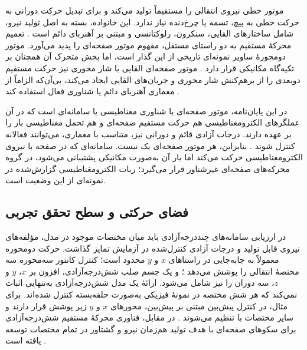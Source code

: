 موتور خطی نیروی انتقالی را مستقیماً تولید می‌کند و برای تبدیل حرکت دورانی به حرکت خطی به پیچ، تسمه یا چرخ‌دنده نیاز ندارد. این خانواده، بسته به اصل تولید نیرو، شامل ساختارهای القایی، سنکرون، رلوکتانسی و مبتنی بر آهنربای دائم است \cite{pierrejeanReviewModelingDesign2024}. تعمیم محرکهٔ مستقیم به دو راستای مستقل، مفهوم موتور صفحه‌ای را پدید می‌آورد. موتور دومحورهٔ ساویر نمونه‌ای تاریخی از این گذار است، اما بخش متحرک آن همچنان بر تکیه‌گاه مکانیکی قرار دارد \cite{edmondr.p.peltaTwoAxisSawyerMotor1987}. موتور صفحه‌ای القایی با شار محوری نیز حرکت مستقیم دوبعدی را از برهم‌کنش شار محوری و جریان‌های القایی ایجاد می‌کند، بی‌آن‌که الزاماً از معماری آهنربای دائم یا شناوری فعال استفاده کند \cite{liElectromagneticAnalysisAxialflux2024}.

در این پایان‌نامه، موتور صفحه‌ای با شناوری مغناطیسی یا  سامانه‌ای است که در آن عملگرهای الکترومغناطیسی هم حرکت مستقیم صفحه‌ای و هم تحمل مغناطیسی بار را بر عهده دارند. درجات آزادی قائم و دورانی نیز، متناسب با معماری، می‌توانند فعالانه کنترل شوند \cite{jansenMagneticallyLevitatedPlanar2007,jansenModelingMagneticallyLevitated2007}. بنابراین، هر موتور صفحه‌ای یک  نیست. سامانه‌ای که در صفحه با نیروی الکترومغناطیسی حرکت می‌کند اما بار آن به‌صورت مکانیکی پشتیبانی می‌شود، در گروه محرکه‌های صفحه‌ای غیرشناور قرار می‌گیرد؛ ربات الکترومغناطیسی گزارش‌شده در \cite{liNonLevitativeElectromagnetRobot2025} نمونه‌ای از این وضعیت است.

\subsection{فضای حرکتی و سطح تحقق تجربی}
\label{subsec:motion_space}

در ارزیابی سامانه‌های چنددرجه‌آزادی باید میان مختصات موجود در مدل، مؤلفه‌های نیروی قابل تولید و درجات آزادی کنترل‌شده در آزمایش تمایز گذاشت. حرکت دومحوره معمولاً به جابه‌جایی در راستاهای $x$ و $y$ محدود است؛ کنترل کانتور سه‌محوره سه مختصهٔ انتقالی را پوشش می‌دهد \cite{j.liHighPrecisionTriaxialContouring2026}؛ و یک جسم صلب شش‌درجه‌آزادی، افزون بر $x$، $y$ و $z$، سه دوران را نیز شامل می‌شود. ارائهٔ یک مدل شش‌درجه‌آزادی به‌تنهایی اثبات نمی‌کند که هر شش مختصه در نمونهٔ فیزیکی به‌صورت حلقه‌بسته کنترل شده‌اند. برای مثال، در کنترل پیش‌بین مبتنی بر پیش‌بین، محورهای $x$ و $y$ زیر پوشش  قرار دارند و سایر مختصات با  تنظیم می‌شوند \cite{xuPredictorbasedModelPredictive2023}. در مقابل، فناوری محرکهٔ مستقیم شش‌درجه‌آزادی برای سکوهای صفحه‌ای با هدف تولید هم‌زمان نیرو و گشتاور در تمام مختصات توسعه یافته است \cite{lu6DDirectdriveTechnology2012}.

